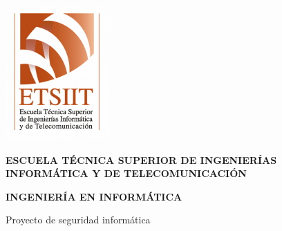 \pagestyle{empty}
\begin{titlepage}

  \begin{center}

    \includegraphics[scale=.2]{logo_ugr.png} \\

    \vspace{2.0cm}

    \LARGE{\textbf{ESCUELA TÉCNICA SUPERIOR DE INGENIERÍAS INFORMÁTICA Y DE TELECOMUNICACIÓN}} \\
      
    \vspace{1.0cm}

    \Large{\textbf{INGENIERÍA EN INFORMÁTICA}} \\

    \vspace{3.0cm}

    \Large{Proyecto de seguridad informática}

  \end{center}
\end{titlepage}
